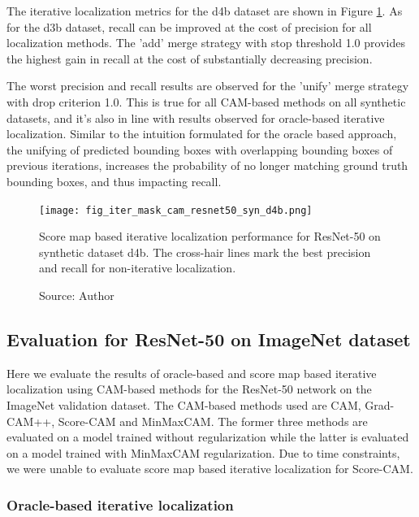 The iterative localization metrics for the d4b dataset are shown in Figure \ref{fig:prec_iter_mask_cam_resnet50_syn_d4b}. As for the d3b dataset, recall can be improved at the cost of precision for all localization methods. The 'add' merge strategy with stop threshold 1.0 provides the highest gain in recall at the cost of substantially decreasing precision.

The worst precision and recall results are observed for the 'unify' merge strategy with drop criterion 1.0. This is true for all CAM-based methods on all synthetic datasets, and it's also in line with results observed for oracle-based iterative localization. Similar to the intuition formulated for the oracle based approach, the unifying of predicted bounding boxes with overlapping bounding boxes of previous iterations, increases the probability of no longer matching ground truth bounding boxes, and thus impacting recall.

\begin{figure}[h]
    \begin{center}       
    \texttt{[image: fig\_iter\_mask\_cam\_resnet50\_syn\_d4b.png]}
    \caption[Score map based iterative localization performance for ResNet-50 on synthetic dataset d4b]{Score map based iterative localization performance for ResNet-50 on synthetic dataset d4b. The cross-hair lines mark the best precision and recall for non-iterative localization.}
    \caption*{Source: Author}
    \label{fig:prec_iter_mask_cam_resnet50_syn_d4b}
    \end{center}
\end{figure}

\subsection{Evaluation for ResNet-50 on ImageNet dataset}
Here we evaluate the results of oracle-based and score map based iterative localization using CAM-based methods for the ResNet-50 network on the ImageNet validation dataset. The CAM-based methods used are CAM, Grad-CAM++, Score-CAM and MinMaxCAM. The former three methods are evaluated on a model trained without regularization while the latter is evaluated on a model trained with MinMaxCAM regularization. Due to time constraints, we were unable to evaluate score map based iterative localization for Score-CAM.

\subsubsection{Oracle-based iterative localization}

